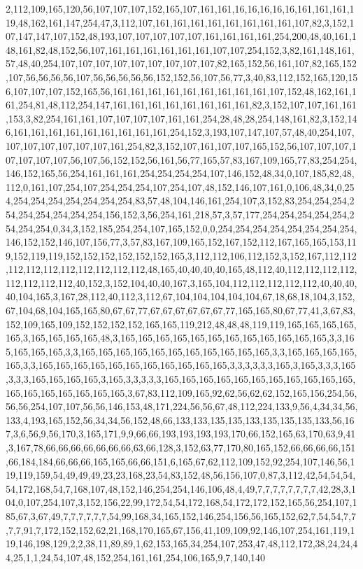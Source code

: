 2,112,109,165,120,56,107,107,107,152,165,107,161,161,16,16,16,16,16,161,161,161,119,48,162,161,147,254,47,3,112,107,161,161,161,161,161,161,161,161,107,82,3,152,107,147,147,107,152,48,193,107,107,107,107,107,161,161,161,161,254,200,48,40,161,148,161,82,48,152,56,107,161,161,161,161,161,161,107,107,254,152,3,82,161,148,161,57,48,40,254,107,107,107,107,107,107,107,107,107,82,165,152,56,161,107,82,165,152,107,56,56,56,56,107,56,56,56,56,56,152,152,56,107,56,77,3,40,83,112,152,165,120,156,107,107,107,152,165,56,161,161,161,161,161,161,161,161,161,107,152,48,162,161,161,254,81,48,112,254,147,161,161,161,161,161,161,161,161,82,3,152,107,107,161,161,153,3,82,254,161,161,107,107,107,107,161,161,254,28,48,28,254,148,161,82,3,152,146,161,161,161,161,161,161,161,161,161,254,152,3,193,107,147,107,57,48,40,254,107,107,107,107,107,107,107,161,254,82,3,152,107,161,107,107,165,152,56,107,107,107,107,107,107,107,56,107,56,152,152,56,161,56,77,165,57,83,167,109,165,77,83,254,254,146,152,165,56,254,161,161,161,254,254,254,254,107,146,152,48,34,0,107,185,82,48,112,0,161,107,254,107,254,254,254,107,254,107,48,152,146,107,161,0,106,48,34,0,254,254,254,254,254,254,254,254,83,57,48,104,146,161,254,107,3,152,83,254,254,254,254,254,254,254,254,254,156,152,3,56,254,161,218,57,3,57,177,254,254,254,254,254,254,254,254,0,34,3,152,185,254,254,107,165,152,0,0,254,254,254,254,254,254,254,254,146,152,152,146,107,156,77,3,57,83,167,109,165,152,167,152,112,167,165,165,153,119,152,119,119,152,152,152,152,152,152,165,3,112,112,106,112,152,3,152,167,112,112,112,112,112,112,112,112,112,112,48,165,40,40,40,40,165,48,112,40,112,112,112,112,112,112,112,112,40,152,3,152,104,40,40,167,3,165,104,112,112,112,112,112,40,40,40,40,104,165,3,167,28,112,40,112,3,112,67,104,104,104,104,104,67,18,68,18,104,3,152,67,104,68,104,165,165,80,67,67,77,67,67,67,67,67,67,77,165,165,80,67,77,41,3,67,83,152,109,165,109,152,152,152,152,165,165,119,212,48,48,48,119,119,165,165,165,165,165,3,165,165,165,165,48,3,165,165,165,165,165,165,165,165,165,165,165,165,3,3,165,165,165,165,3,3,165,165,165,165,165,165,165,165,165,165,165,3,3,165,165,165,165,165,3,3,165,165,165,165,165,165,165,165,165,165,165,3,3,3,3,3,3,165,3,165,3,3,3,165,3,3,3,165,165,165,165,3,165,3,3,3,3,3,165,165,165,165,165,165,165,165,165,165,165,165,165,165,165,165,165,165,3,67,83,112,109,165,92,62,56,62,62,152,165,156,254,56,56,56,254,107,107,56,56,146,153,48,171,224,56,56,67,48,112,224,133,9,56,4,34,34,56,133,4,193,165,152,56,34,34,56,152,48,66,133,133,135,135,133,135,135,135,133,56,167,3,6,56,9,56,170,3,165,171,9,9,66,66,193,193,193,193,170,66,152,165,63,170,63,9,41,3,167,78,66,66,66,66,66,66,66,63,66,128,3,152,63,77,170,80,165,152,66,66,66,66,151,66,184,184,66,66,66,165,165,66,66,151,6,165,67,62,112,109,152,92,254,107,146,56,119,119,159,54,49,49,49,23,23,168,23,54,83,152,48,56,156,107,0,87,3,112,42,54,54,54,54,172,168,54,7,168,107,48,152,146,254,254,146,106,48,4,49,7,7,7,7,7,7,7,7,42,28,3,104,0,107,254,107,3,152,156,22,99,172,54,54,172,168,54,172,172,152,165,56,254,107,185,67,3,67,49,7,7,7,7,7,7,54,99,168,34,165,152,146,254,156,56,165,152,62,7,54,54,7,7,7,7,91,7,172,152,152,62,21,168,170,165,67,156,41,109,109,92,146,107,254,161,119,119,146,198,129,2,2,38,11,89,89,1,62,153,165,34,254,107,253,47,48,112,172,38,24,24,44,25,1,1,24,54,107,48,152,254,161,161,254,106,165,9,7,140,140